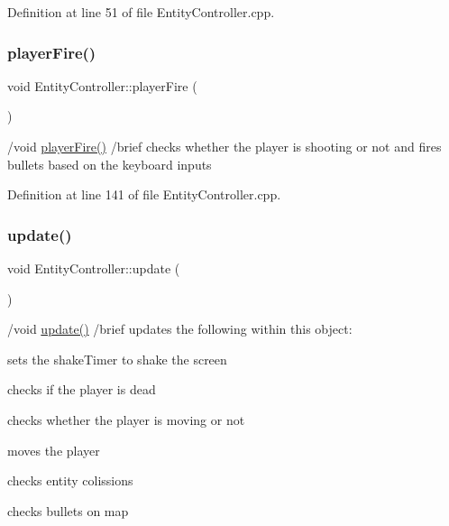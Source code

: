 Definition at line 51 of file Entity\+Controller.\+cpp.

\mbox{\label{class_entity_controller_a1b1859bc8e5bfa72a0f1f34be3b1d5bd}} 
\subsubsection{\texorpdfstring{player\+Fire()}{playerFire()}}
{\footnotesize\ttfamily void Entity\+Controller\+::player\+Fire (\begin{DoxyParamCaption}{ }\end{DoxyParamCaption})}

/void \hyperlink{class_entity_controller_a1b1859bc8e5bfa72a0f1f34be3b1d5bd}{player\+Fire()} /brief checks whether the player is shooting or not and fires bullets based on the keyboard inputs 

Definition at line 141 of file Entity\+Controller.\+cpp.

\mbox{\label{class_entity_controller_a3d7a4f7f330f070be70103bd00cf0f16}} 
\subsubsection{\texorpdfstring{update()}{update()}}
{\footnotesize\ttfamily void Entity\+Controller\+::update (\begin{DoxyParamCaption}{ }\end{DoxyParamCaption})}

/void \hyperlink{class_entity_controller_a3d7a4f7f330f070be70103bd00cf0f16}{update()} /brief updates the following within this object\+:
\begin{DoxyItemize}
\item sets the shake\+Timer to shake the screen
\item checks if the player is dead
\item checks whether the player is moving or not
\item moves the player
\item checks entity colissions
\item checks bullets on map 
\end{DoxyItemize}

